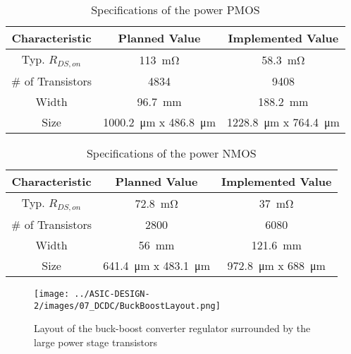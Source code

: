 \begin{table}[H]
    \centering
    \begin{tabular}{|c|c|c|}
        Characteristic & Planned Value & Implemented Value \\
        \hline
		 Typ. $R_{DS,on}$ & \qty{113}{\milli\ohm}  & \qty{58.3}{\milli\ohm} \\
         \# of Transistors & \qty{4834}{}  & \qty{9408}{} \\
		 Width & \qty{96.7}{\milli\meter} & \qty{188.2}{\milli\meter}\\
		 Size & \qty{1000.2}{\micro\meter} x \qty{486.8}{\micro\meter} & \qty{1228.8}{\micro\meter} x \qty{764.4}{\micro\meter}
    \end{tabular}
    \caption{Specifications of the power \ac{PMOS}}
    \label{tab:spec_pmos}
\end{table}

\clearpage
\begin{table}[H]
    \centering
    \begin{tabular}{|c|c|c|}
        Characteristic & Planned Value & Implemented Value \\
        \hline
		 Typ. $R_{DS,on}$ & \qty{72.8}{\milli\ohm} & \qty{37}{\milli\ohm} \\
         \# of Transistors & \qty{2800}{}  & \qty{6080}{} \\
		 Width & \qty{56}{\milli\meter} & \qty{121.6}{\milli\meter} \\
		 Size & \qty{641.4}{\micro\meter} x \qty{483.1}{\micro\meter} & \qty{972.8}{\micro\meter} x \qty{688}{\micro\meter}
    \end{tabular}
    \caption{Specifications of the power \ac{NMOS}}
    \label{tab:spec_nmos}
\end{table}

\begin{figure}[h]
    \centering
    \texttt{[image: ../ASIC-DESIGN-2/images/07\_DCDC/BuckBoostLayout.png]}
    \caption{Layout of the buck-boost converter regulator surrounded by the large power stage transistors}
    \label{fig:BBlayout}
\end{figure}

\clearpage

